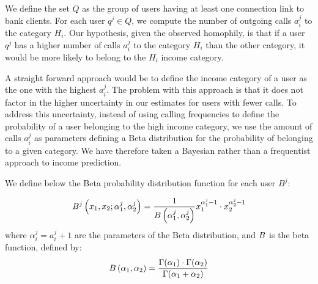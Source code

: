 
We define the set $Q$ as the group of users having at least one connection link to bank clients. For each user $q^j \in Q$, we compute the number of outgoing calls $a^j_i$ to the category $H_i$. Our hypothesis, given the observed homophily, is that if a user $q^j$ has a higher number of calls $a^j_i$ to the category $H_i$ than the other category, it would be more likely to belong to the $H_i$ income category. 

A straight forward approach would be to define the income category of a user as the one with the highest $a^j_i$. The problem with this approach is that it does not factor in the higher uncertainty in our estimates for users with fewer calls. To address this uncertainty, instead of using calling frequencies to define the probability of a user belonging to the high income category, we use the amount of calls $a^j_i$  as parameters defining a Beta distribution for the probability of belonging to a given category. We have therefore taken a Bayesian rather than a frequentist approach to income prediction. 

We define below the Beta probability distribution function for each user $B^j$:  


\begin{equation}
B^j \left( x_1, x_2; \alpha^j_1,\alpha^j_2 \right) = \frac{1}{B \left( \alpha^j_1, \alpha^j_2 \right)} x_1^{\alpha^j_1 - 1} \cdot x_2^{\alpha^j_2 - 1}
\label{Beta}
\end{equation}
where $\alpha^j_i = a^j_i +1$ are the parameters of the Beta distribution, 
and $B$ is the beta function, defined by:
\begin{equation}
B \left( \alpha_1, \alpha_2 \right) = 
\frac{ \Gamma \! \left( \alpha_1 \right) \cdot \Gamma \! \left( \alpha_2 \right)}
{\Gamma \! \left( \alpha_1 + \alpha_2 \right) }
\label{Beta} 
\end{equation}


